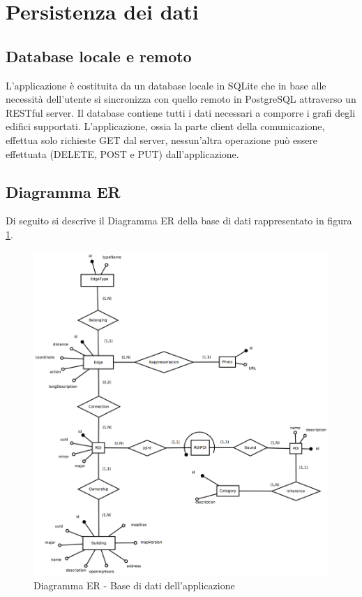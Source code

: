 \documentclass[../ManualeSviluppatore.tex]{subfiles}
\begin{document}
\section{Persistenza dei dati}
\label{sec:PersistenzaDeiDati}

	\subsection{Database locale e remoto}
		L'applicazione è costituita da un database locale in SQLite che in base alle necessità dell'utente si sincronizza con quello remoto in PostgreSQL attraverso un RESTful server. Il database contiene tutti i dati necessari a comporre i grafi degli edifici supportati. L'applicazione, ossia la parte client della comunicazione, effettua solo richieste GET dal server, nessun'altra operazione può essere effettuata (DELETE, POST e PUT) dall'applicazione. 
	
		\subsection{Diagramma ER}
			Di seguito si descrive il Diagramma ER della base di dati rappresentato in figura \ref{fig:Database}.
		\begin{figure} [p]
			\centering
				\includegraphics[width=\textwidth]{img/db}		
				\caption{Diagramma ER - Base di dati dell'applicazione}
				\label{fig:Database}
		\end{figure}
		
\end{document}
